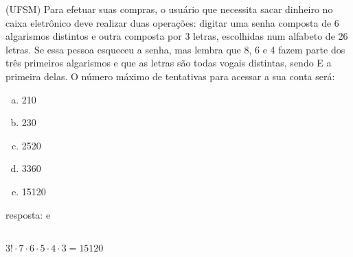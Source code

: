 \begin{ex}
 (UFSM) Para efetuar suas compras, o usuário que necessita sacar dinheiro no caixa eletrônico deve realizar duas operações: digitar uma senha composta de 6 algarismos distintos e outra composta por 3 letras, escolhidas num alfabeto de 26 letras. Se essa pessoa esqueceu a senha, mas lembra que 8, 6 e 4 fazem parte dos três primeiros algarismos e que as letras são todas vogais distintas, sendo E a primeira delas. O número máximo de tentativas para acessar a sua conta será:
    \begin{enumerate}[(a)]
    \item 210
    \item 230
    \item 2520
    \item 3360
    \item 15120
    \end{enumerate}
      \begin{sol}
        resposta: e \\
         \\
       $3!\cdot7\cdot6\cdot5\cdot4\cdot3=15120$
      \end{sol}
\end{ex}